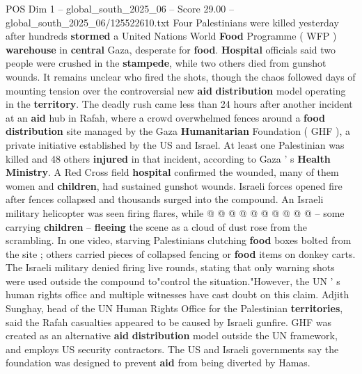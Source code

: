 \begin{textsample}{POS Dim 1 – global\_south\_2025\_06 – Score 29.00 – global\_south\_2025\_06/125522610.txt}  \label{ex:f1_pos_140}
Four Palestinians were killed yesterday after hundreds \textbf{stormed} a United Nations World \textbf{Food} Programme ( WFP ) \textbf{warehouse} in \textbf{central} Gaza, desperate for \textbf{food}. \textbf{Hospital} officials said two people were crushed in the \textbf{stampede}, while two others died from gunshot wounds.
It remains unclear who fired the shots, though the chaos followed days of mounting tension over the controversial new \textbf{aid} \textbf{distribution} model operating in the \textbf{territory}.
The deadly rush came less than 24 hours after another incident at an \textbf{aid} hub in Rafah, where a crowd overwhelmed fences around a \textbf{food} \textbf{distribution} site managed by the Gaza \textbf{Humanitarian} Foundation ( GHF ), a private initiative established by the US and Israel.
At least one Palestinian was killed and 48 others \textbf{injured} in that incident, according to Gaza ' s \textbf{Health} \textbf{Ministry}.
A Red Cross field \textbf{hospital} confirmed the wounded, many of them women and \textbf{children}, had sustained gunshot wounds.
Israeli forces opened fire after fences collapsed and thousands surged into the compound.
An Israeli military helicopter was seen firing flares, while @ @ @ @ @ @ @ @ @ @ -- some carrying \textbf{children} -- \textbf{fleeing} the scene as a cloud of dust rose from the scrambling.
In one video, starving Palestinians clutching \textbf{food} boxes bolted from the site ; others carried pieces of collapsed fencing or \textbf{food} items on donkey carts.
The Israeli military denied firing live rounds, stating that only warning shots were used outside the compound to"control the situation."However, the UN ' s human rights office and multiple witnesses have cast doubt on this claim.
Adjith Sunghay, head of the UN Human Rights Office for the Palestinian \textbf{territories}, said the Rafah casualties appeared to be caused by Israeli gunfire.
GHF was created as an alternative \textbf{aid} \textbf{distribution} model outside the UN framework, and employs US security contractors.
The US and Israeli governments say the foundation was designed to prevent \textbf{aid} from being diverted by Hamas.

\end{textsample}
